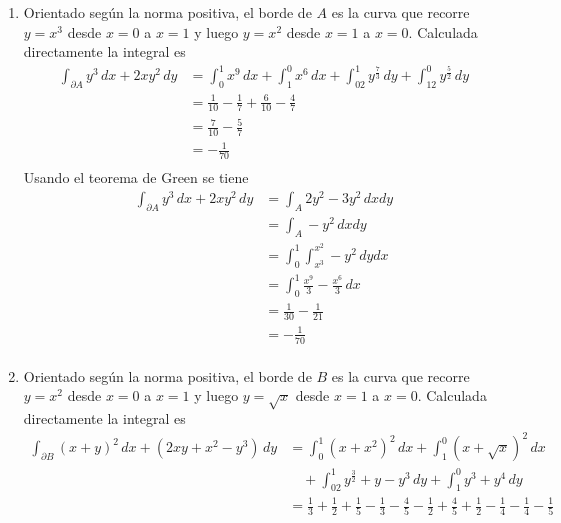 \begin{enumerate}[label=\alph*)]
    \item Orientado según la norma positiva, el borde de $A$ es la curva que recorre $y=x^3$ desde $x=0$ a $x=1$ y luego $y=x^2$ desde $x=1$ a $x=0$. Calculada directamente la integral es
    \begin{equation}
    \begin{split}
        \int_{\partial A} y^3\,dx + 2xy^2\,dy &= \int^1_0x^9\,dx+\int^0_1x^6\,dx+\int^1_02y^{\frac{7}{3}}\,dy+\int^0_12y^{\frac{5}{2}}\,dy\\
        &= \frac{1}{10}-\frac{1}{7}+\frac{6}{10}-\frac{4}{7}\\
        &= \frac{7}{10}-\frac{5}{7}\\
        &= -\frac{1}{70}\\
    \end{split}
    \nonumber
    \end{equation}
    Usando el teorema de Green se tiene
    \begin{equation}
    \begin{split}
        \int_{\partial A} y^3\,dx + 2xy^2\,dy &=
        \int_A 2y^2-3y^2\,dxdy\\
        &= \int_A -y^2\,dxdy\\
        &= \int^1_0\int^{x^2}_{x^3}-y^2\,dydx\\
        &= \int^1_0 \frac{x^9}{3}-\frac{x^6}{3} \,dx\\
        &= \frac{1}{30}-\frac{1}{21}\\
        &= -\frac{1}{70}\\
    \end{split}
    \nonumber
    \end{equation}
    \item Orientado según la norma positiva, el borde de $B$ es la curva que recorre $y=x^2$ desde $x=0$ a $x=1$ y luego $y=\sqrt{x}$ desde $x=1$ a $x=0$. Calculada directamente la integral es
    \begin{equation}
    \begin{split}
        \int_{\partial B} (x+y)^2\,dx + (2xy+x^2-y^3)\,dy &= \int^1_0(x+x^2)^2\,dx+\int^0_1(x+\sqrt{x})^2\,dx\\
        &\,\,\,\,\,\,+\int^1_02y^{\frac{3}{2}}+y-y^3\,dy+
        \int^0_1y^3+y^4\,dy\\
        &= \frac{1}{3}+\frac{1}{2}+\frac{1}{5}-\frac{1}{3}-
        \frac{4}{5}-\frac{1}{2}+\frac{4}{5}+\frac{1}{2}-
        \frac{1}{4}-\frac{1}{4}-\frac{1}{5}\\

\end{split}
\end{equation}
\end{enumerate}
